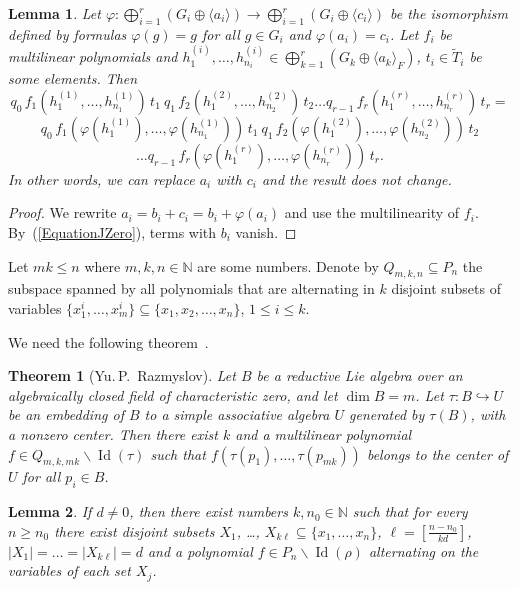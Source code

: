 \documentclass[12pt, reqno, a4paper]{amsart}
\theoremstyle{plain}
\newtheorem{lemma}{Lemma}
\newtheorem{theorem}{Theorem}
\theoremstyle{remark}
\theoremstyle{definition}
\begin{document}
\begin{lemma}\label{LemmaChange}
Let $\varphi \colon \bigoplus_{i=1}^r(G_i \oplus \langle a_i \rangle) \to
\bigoplus_{i=1}^r(G_i \oplus \langle c_i \rangle) $
be the isomorphism defined by formulas $\varphi(g)=g$ for
all $g \in G_i$ and $\varphi(a_i)=c_i$.
Let $f_i$ be multilinear polynomials and $h^{(i)}_1, \ldots, h^{(i)}_{n_i}
\in \bigoplus_{k=1}^r(G_k \oplus \langle a_k \rangle_F)$, $t_i \in
\tilde T_i$ be some elements.
Then $$q_0\,f_1(h^{(1)}_1, \ldots, h^{(1)}_{n_1})\, t_1\
q_1\, f_2(h^{(2)}_1, \ldots, h^{(2)}_{n_2})\, t_2
\ldots q_{r-1}\, f_r(h^{(r)}_1, \ldots, h^{(r)}_{n_r})\, t_r
=$$
$$q_0\, f_1(\varphi(h^{(1)}_1), \ldots, \varphi(h^{(1)}_{n_1}))\, t_1\
q_1\, f_2(\varphi(h^{(2)}_1), \ldots, \varphi(h^{(2)}_{n_2}))\, t_2$$ $$
\ldots q_{r-1}\, f_r(\varphi(h^{(r)}_1), \ldots, \varphi(h^{(r)}_{n_r}))\, t_r.
$$ In other words, we can replace $a_i$ with $c_i$ and the result does not change.
\end{lemma}
\begin{proof}
We rewrite $a_i=b_i+c_i=b_i+\varphi(a_i)$ and use the multilinearity
of $f_i$. By~(\ref{EquationJZero}), terms with $b_i$ vanish.
\end{proof}

Let $mk \leqslant n$ where $m,k,n \in \mathbb N$ are some numbers.
 Denote by $Q_{m,k,n} \subseteq P_n$
the subspace spanned by all polynomials that are alternating in
$k$ disjoint subsets of variables $\{x^i_1, \ldots, x^i_m \}
\subseteq \lbrace x_1, x_2, \ldots, x_n\rbrace$, $1 \leqslant i \leqslant k$.

We need the following theorem~\cite[Remark~12.1]{Razmyslov}.

\begin{theorem}[Yu.\,P.~Razmyslov]\label{Razmyslov}
Let $B$ be a reductive Lie algebra over an algebraically closed field
of characteristic zero, and let $\dim B = m$. Let $\tau \colon B \hookrightarrow U$ be an
embedding of $B$ to a simple associative algebra $U$ generated by $\tau(B)$, with a nonzero
center. Then there exist $k$ and a multilinear
polynomial $f \in Q_{m,k,mk} \backslash \operatorname{Id}(\tau)$
such that $f(\tau(p_1), \ldots, \tau(p_{mk}))$ belongs to the center of $U$ for all $p_i \in B$.
\end{theorem}

\begin{lemma}\label{LemmaAlt} If $d \ne 0$, then there exist numbers $k, n_0 \in \mathbb N$ such that for every $n\geqslant n_0$
there exist disjoint subsets $X_1$, \ldots, $X_{k\ell} \subseteq \lbrace x_1, \ldots, x_n
\rbrace$, $\ell = \left[\frac{n-n_0}{kd}\right]$,
$|X_1| = \ldots = |X_{k\ell}|=d$ and a polynomial $f \in P_n \backslash
\operatorname{Id}(\rho)$ alternating on the variables of each set $X_j$.
\end{lemma}
\end{document}
